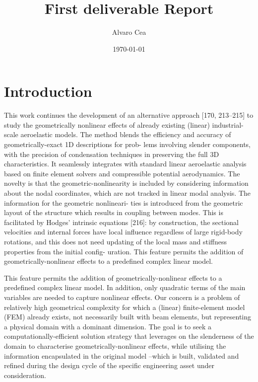 \documentclass[11pt]{article}
\author{Alvaro Cea}
\date{\today}
\title{First deliverable Report}
\begin{document}
\newcommand{\bs}[1]{\boldsymbol{#1}}
\newcommand{\rhoinf}{\rho}	
\newcommand{\Vinf}{U}
\newcommand{\Cl}[1]{c_{l_{#1}}}
\newcommand{\barCl}[1]{\bar{c}_{l_{#1}}}
\newcommand{\Cm}[1]{c_{m_{#1}}}
\newcommand{\barCm}[1]{\bar{c}_{m_{#1}}}
\newcommand{\AIC}{\bs{\mathcal{A}}}


\maketitle
\tableofcontents


\section{Introduction}
\label{sec:orgad08129}
This work continues the development of an alternative approach [170, 213–215] to study the
geometrically nonlinear effects of already existing (linear) industrial-scale aeroelastic models.
The method blends the efficiency and accuracy of geometrically-exact 1D descriptions for prob-
lems involving slender components, with the precision of condensation techniques in preserving
the full 3D characteristics. It seamlessly integrates with standard linear aeroelastic analysis
based on finite element solvers and compressible potential aerodynamics. The novelty is that
the geometric-nonlinearity is included by considering information about the nodal coordinates,
which are not tracked in linear modal analysis. The information for the geometric nonlineari-
ties is introduced from the geometric layout of the structure which results in coupling between
modes. This is facilitated by Hodges’ intrinsic equations [216]: by construction, the sectional
velocities and internal forces have local influence regardless of large rigid-body rotations, and
this does not need updating of the local mass and stiffness properties from the initial config-
uration. This feature permits the addition of geometrically-nonlinear effects to a predefined
complex linear model.

This feature permits the addition of geometrically-nonlinear effects to a predefined
complex linear model. In addition, only quadratic terms of the main variables are needed to capture nonlinear effects. Our concern is a problem of relatively high geometrical complexity
for which a (linear) finite-element model (FEM) already exists, not necessarily built with beam
elements, but representing a physical domain with a dominant dimension. The goal is to seek
a computationally-efficient solution strategy that leverages on the slenderness of the domain
to characterise geometrically-nonlinear effects, while utilising the information encapsulated in
the original model –which is built, validated and refined during the design cycle of the specific
engineering asset under consideration.
\end{document}
